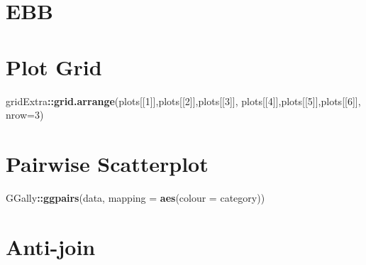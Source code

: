 \documentclass[]{book}
\newenvironment{Shaded}{\begin{snugshade}}{\end{snugshade}}
\newcommand{\KeywordTok}[1]{\textcolor[rgb]{0.13,0.29,0.53}{\textbf{#1}}}
\newcommand{\DataTypeTok}[1]{\textcolor[rgb]{0.13,0.29,0.53}{#1}}
\newcommand{\DecValTok}[1]{\textcolor[rgb]{0.00,0.00,0.81}{#1}}
\newcommand{\StringTok}[1]{\textcolor[rgb]{0.31,0.60,0.02}{#1}}
\newcommand{\OperatorTok}[1]{\textcolor[rgb]{0.81,0.36,0.00}{\textbf{#1}}}
\newcommand{\NormalTok}[1]{#1}
\begin{document}
\section{EBB}\label{ebb}

\begin{Shaded}
\end{Shaded}

\section{Plot Grid}\label{plot-grid}

\begin{Shaded}
\begin{Highlighting}[]
\NormalTok{gridExtra}\OperatorTok{::}\KeywordTok{grid.arrange}\NormalTok{(plots[[}\DecValTok{1}\NormalTok{]],plots[[}\DecValTok{2}\NormalTok{]],plots[[}\DecValTok{3}\NormalTok{]], plots[[}\DecValTok{4}\NormalTok{]],plots[[}\DecValTok{5}\NormalTok{]],plots[[}\DecValTok{6}\NormalTok{]], }\DataTypeTok{nrow=}\DecValTok{3}\NormalTok{)}
\end{Highlighting}
\end{Shaded}

\section{Pairwise Scatterplot}\label{pairwise-scatterplot}

\begin{Shaded}
\begin{Highlighting}[]
\NormalTok{GGally}\OperatorTok{::}\KeywordTok{ggpairs}\NormalTok{(data, }\DataTypeTok{mapping =} \KeywordTok{aes}\NormalTok{(}\DataTypeTok{colour =}\NormalTok{ category))}
\end{Highlighting}
\end{Shaded}

\section{Anti-join}\label{anti-join}
\end{document}
